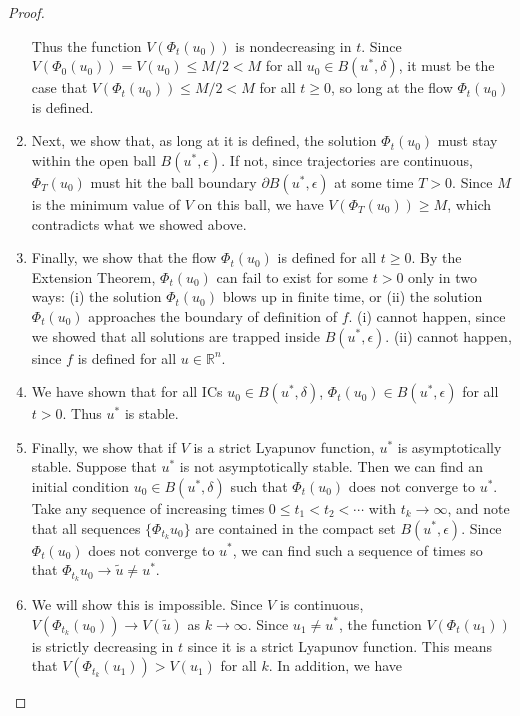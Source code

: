 \documentclass{article}
\def\R{{\mathbb R}}
\begin{document}
\begin{proof}
\begin{enumerate}
	Thus the function $V(\Phi_t(u_0))$ is nondecreasing in $t$. Since $V(\Phi_0(u_0)) = V(u_0) \leq M/2 < M$ for all $u_0 \in B(u^*, \delta)$, it must be the case that $V(\Phi_t(u_0)) \leq M/2 < M$ for all $t \geq 0$, so long at the flow $\Phi_t(u_0)$ is defined. 

	\item Next, we show that, as long at it is defined, the solution $\Phi_t(u_0)$ must stay within the open ball $B(u^*, \epsilon)$. If not, since trajectories are continuous, $\Phi_T(u_0)$ must hit the ball boundary $\partial B(u^*, \epsilon)$ at some time $T > 0$. Since $M$ is the minimum value of $V$ on this ball, we have $V( \Phi_T(u_0) ) \geq M$, which contradicts what we showed above.

	\item Finally, we show that the flow $\Phi_t(u_0)$ is defined for all $t \geq 0$. By the Extension Theorem, $\Phi_t(u_0)$ can fail to exist for some $t > 0$ only in two ways: (i) the solution $\Phi_t(u_0)$ blows up in finite time, or (ii) the solution $\Phi_t(u_0)$ approaches the boundary of definition of $f$. (i) cannot happen, since we showed that all solutions are trapped inside $B(u^*, \epsilon)$. (ii) cannot happen, since $f$ is defined for all $u \in \R^n$.
	
	\item We have shown that for all ICs $u_0 \in B(u^*, \delta)$, $\Phi_t(u_0) \in B(u^*, \epsilon)$ for all $t > 0$. Thus $u^*$ is stable.

	\item Finally, we show that if $V$ is a strict Lyapunov function, $u^*$ is asymptotically stable. Suppose that $u^*$ is not asymptotically stable. Then we can find an initial condition $u_0 \in B(u^*, \delta)$ such that $\Phi_t(u_0)$ does not converge to $u^*$. Take any sequence of increasing times $0 \leq t_1 < t_2 < \cdots$ with $t_k \rightarrow \infty$, and note that all sequences $\{ \Phi_{t_k} u_0 \}$ are contained in the compact set $B(u^*, \epsilon)$. Since $\Phi_t(u_0)$ does not converge to $u^*$, we can find such a sequence of times so that $\Phi_{t_k} u_0 \rightarrow \tilde{u} \neq u^*$.

	\item We will show this is impossible. Since $V$ is continuous, $V( \Phi_{t_k}(u_0) ) \rightarrow V(\tilde{u})$ as $k \rightarrow \infty$. Since $u_1 \neq u^*$, the function $V(\Phi_t(u_1))$ is strictly decreasing in $t$ since it is a strict Lyapunov function. This means that $V(\Phi_{t_k}(u_1)) > V(u_1)$ for all $k$. In addition, we have


\end{enumerate}
\end{proof}
\end{document}
